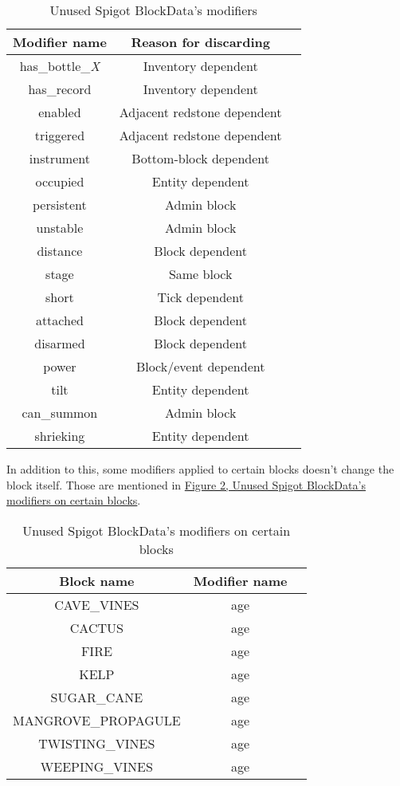 \documentclass[11pt]{article}
\begin{document}
\begin{table}[h]
	\centering
	\begin{tabular}{ |c|c|c| }
		\hline
		Modifier name & Reason for discarding \\
		\hline
		has\_bottle\_\it{X} & Inventory dependent \\
		has\_record & Inventory dependent \\
		enabled & Adjacent redstone dependent \\
		triggered & Adjacent redstone dependent \\
		instrument & Bottom-block dependent \\
		occupied & Entity dependent \\
		persistent & Admin block \\
		unstable & Admin block \\
		distance & Block dependent \\
		stage & Same block \\
		short & Tick dependent \\
		attached & Block dependent \\
		disarmed & Block dependent \\
		power & Block/event dependent \\
		tilt & Entity dependent \\
		can\_summon & Admin block \\
		shrieking & Entity dependent \\
		\hline
	\end{tabular}
	\caption{Unused Spigot BlockData's modifiers}
	\label{fig:unused-blockdata}
\end{table}

In addition to this, some modifiers applied to certain blocks doesn't change the block itself. Those are mentioned in \hyperref[fig:unused-blockdata-blocks]{Figure \ref{fig:unused-blockdata-blocks}, Unused Spigot BlockData's modifiers on certain blocks}.

\begin{table}[h]
	\centering
	\begin{tabular}{ |c|c|c| }
		\hline
		Block name & Modifier name \\
		\hline
		CAVE\_VINES & age \\
		CACTUS & age \\
		FIRE & age \\
		KELP & age \\
		SUGAR\_CANE & age \\
		MANGROVE\_PROPAGULE & age \\
		TWISTING\_VINES & age \\
		WEEPING\_VINES & age \\
		\hline
	\end{tabular}
	\caption{Unused Spigot BlockData's modifiers on certain blocks}
	\label{fig:unused-blockdata-blocks}
\end{table}
\end{document}
